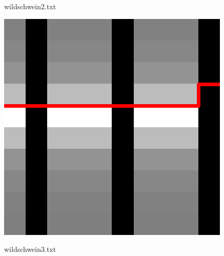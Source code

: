 \documentclass[a4paper, 12pt]{scrartcl}
\begin{document}
\begin{center}
\begin{minipage}[t]{.3\textwidth}
		\ttfamily wildschwein2.txt
	\end{minipage}\hfill
	\begin{minipage}[t]{.3\textwidth}
		\centering
		\includegraphics[width=\textwidth]{img/resized3}\par
		\ttfamily wildschwein3.txt
	\end{minipage}
	\vspace{1em}


\end{center}
\end{document}
